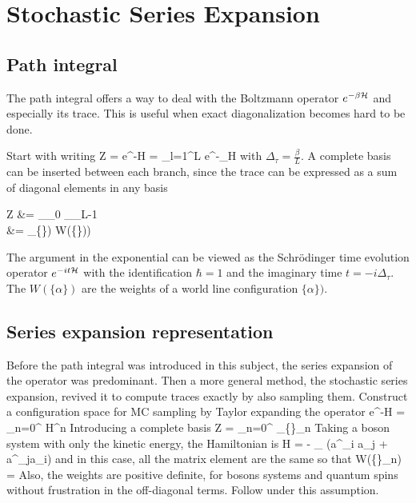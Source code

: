 \chapter{Stochastic Series Expansion}

	\section{Path integral}

		The path integral offers a way to deal with the Boltzmann operator $e^{-\beta \mathcal H}$ and especially its trace. This is useful when exact diagonalization becomes hard to be done. 

		Start with writing
		\be Z = \tr e^{-\beta \mc H} = \tr \prod_{l=1}^L e^{-\Delta_\tau \mc H} \ee
		with $\Delta_\tau = \frac{\beta}{L}$. A complete basis can be inserted between each branch, since the trace can be expressed as a sum of diagonal elements in any basis
		\be \begin{split} Z &= \sum_{\alpha_0} \cdots \sum_{\alpha_{L-1}}  \cdots {} \\ &= \sum_{\{\alpha\})} W(\{\alpha\})) \end{split} \ee
		The argument in the exponential can be viewed as the Schrödinger time evolution operator $e^{-it\mathcal H}$ with the identification $\hbar=1$ and the imaginary time $t=-i\Delta_\tau$. The $W(\{\alpha\})$ are the weights of a world line configuration $\{\alpha\})$.

	\section{Series expansion representation}

		Before the path integral was introduced in this subject, the series expansion of the operator was predominant. Then a more general method, the stochastic series expansion, revived it to compute traces exactly by also sampling them.	Construct a configuration space for MC sampling by Taylor expanding the operator
		\be e^{-\beta \mc H} = \sum_{n=0}^\infty {} \mc H^n \ee
		Introducing a complete basis
		\be Z = \sum_{n=0}^\infty {} \sum_{\{\alpha\}_n}  \cdots {} \label{eq:ZgenSSE} \ee
		Taking a boson system with only the kinetic energy, the Hamiltonian is 
		\be \mc H = - \sum_{} (a^\dagger_i a_j + a^\dagger_ja_i) \ee
		and in this case, all the matrix element are the same so that
		\be W(\{\alpha\}_n) =  \ee
		Also, the weights are positive definite, for bosons systems and quantum spins without frustration in the off-diagonal terms. Follow under this assumption.

